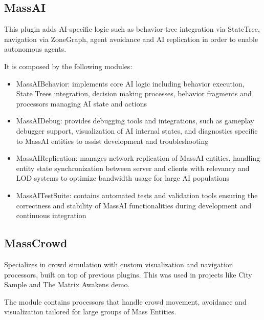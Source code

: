 \subsection{MassAI}

This plugin adds AI-specific logic such as behavior tree integration via StateTree, navigation via ZoneGraph, agent avoidance and AI replication in order to enable autonomous agents.

It is composed by the following modules:

\begin{itemize}
    \item MassAIBehavior: implements core AI logic including behavior execution, State Trees integration, decision making processes, behavior fragments and processors managing AI state and actions
    \item MassAIDebug: provides debugging tools and integrations, such as gameplay debugger support, visualization of AI internal states, and diagnostics specific to MassAI entities to assist development and troubleshooting
    \item MassAIReplication: manages network replication of MassAI entities, handling entity state synchronization between server and clients with relevancy and LOD systems to optimize bandwidth usage for large AI populations
    \item MassAITestSuite: contains automated tests and validation tools ensuring the correctness and stability of MassAI functionalities during development and continuous integration
\end{itemize}

\subsection{MassCrowd}

Specializes in crowd simulation with custom visualization and navigation processors, built on top of previous plugins. This was used in projects like City Sample and The Matrix Awakens demo.

The module contains processors that handle crowd movement, avoidance and visualization tailored for large groups of Mass Entities.